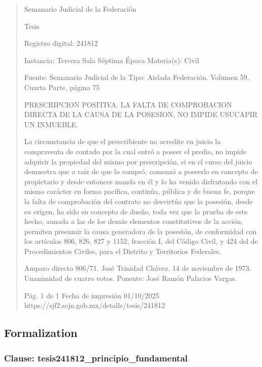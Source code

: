 \documentclass[11pt,a4paper]{article}
\begin{document}
\begin{quote}
                                                   Semanario Judicial de la Federación

                                                  Tesis

 Registro digital: 241812

 Instancia: Tercera Sala          Séptima Época                        Materia(s): Civil

                                  Fuente: Semanario Judicial de la     Tipo: Aislada
                                  Federación.
                                  Volumen 59, Cuarta Parte, página
                                  75


PRESCRIPCION POSITIVA. LA FALTA DE COMPROBACION DIRECTA DE LA CAUSA DE LA
POSESION, NO IMPIDE USUCAPIR UN INMUEBLE.


La circunstancia de que el prescribiente no acredite en juicio la compraventa de contado por la cual
entró a poseer el predio, no impide adquirir la propiedad del mismo por prescripción, si en el curso
del juicio demuestra que a raíz de que lo compró, comenzó a poseerlo en concepto de propietario y
desde entonces manda en él y lo ha venido disfrutando con el mismo carácter en forma pacífica,
continúa, pública y de buena fe, porque la falta de comprobación del contrato no desvirtúa que la
posesión, desde su origen, ha sido en concepto de dueño, toda vez que la prueba de este hecho,
aunada a las de los demás elementos constitutivos de la acción, permiten presumir la causa
generadora de la posesión, de conformidad con los artículos 806, 826, 827 y 1152, fracción I, del
Código Civil, y 424 del de Procedimientos Civiles, para el Distrito y Territorios Federales.


Amparo directo 806/71. José Trinidad Chávez. 14 de noviembre de 1973. Unanimidad de cuatro
votos. Ponente: José Ramón Palacios Vargas.




                                             Pág. 1 de 1             Fecha de impresión 01/10/2025
  https://sjf2.scjn.gob.mx/detalle/tesis/241812

\end{quote}

\subsection{Formalization}

\subsubsection{Clause: tesis241812\_principio\_fundamental}
\end{document}
